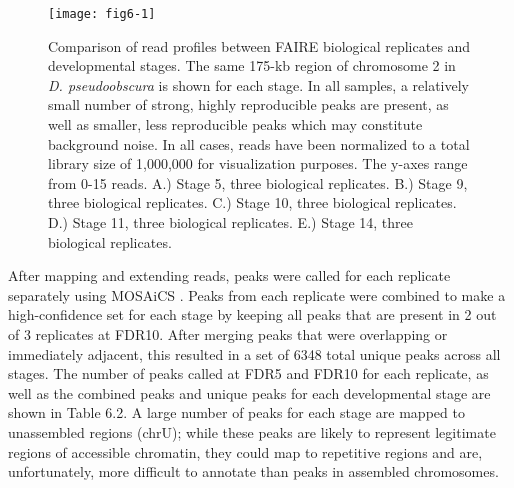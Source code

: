 \begin{figure}
\centering
\texttt{[image: fig6-1]}
\caption[Comparison of read profiles between FAIRE biological replicates and developmental stages]{Comparison of read profiles between FAIRE biological replicates and developmental stages. The same 175-kb region of chromosome 2 in \emph{D. pseudoobscura} is shown for each stage. In all samples, a relatively small number of strong, highly reproducible peaks are present, as well as smaller, less reproducible peaks which may constitute background noise. In all cases, reads have been normalized to a total library size of 1,000,000 for visualization purposes. The y-axes range from 0-15 reads. A.) Stage 5, three biological replicates. B.) Stage 9, three biological replicates. C.) Stage 10, three biological replicates. D.) Stage 11, three biological replicates. E.) Stage 14, three biological replicates.}
\label{Figure 6.1}
\end{figure}

After mapping and extending reads, peaks were called for each replicate separately using MOSAiCS \citep{chung_mosaics_2012}. Peaks from each replicate were combined to make a high-confidence set for each stage by keeping all peaks that are present in 2 out of 3 replicates at FDR10. After merging peaks that were overlapping or immediately adjacent, this resulted in a set of 6348 total unique peaks across all stages. The number of peaks called at FDR5 and FDR10 for each replicate, as well as the combined peaks and unique peaks for each developmental stage are shown in Table 6.2. A large number of peaks for each stage are mapped to unassembled regions (chrU); while these peaks are likely to represent legitimate regions of accessible chromatin, they could map to repetitive regions and are, unfortunately, more difficult to annotate than peaks in assembled chromosomes.

